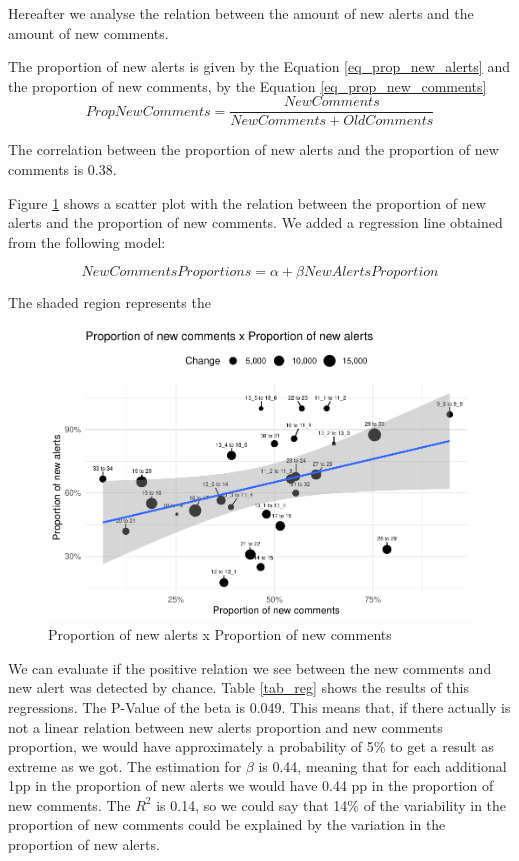 \documentclass[
]{article}
\begin{document}
Hereafter we analyse the relation between the amount of new alerts and
the amount of new comments.

The proportion of new alerts is given by the Equation \ref{eq_prop_new_alerts} and the proportion of new comments, by the Equation \ref{eq_prop_new_comments}
\begin{equation} \label{eq_prop_new_comments}
PropNewComments = \frac{NewComments}{NewComments + OldComments}
\end{equation}

The correlation between the proportion of new alerts and the proportion
of new comments is 0.38.

Figure \ref{scatter_prop} shows a scatter plot with the relation between
the proportion of new alerts and the proportion of new comments. We
added a regression line obtained from the following model:

\[ NewCommentsProportions = \alpha + \beta NewAlertsProportion \]

The shaded region represents the

\small

\begin{figure}
\centering
\includegraphics{report_files/figure-latex/unnamed-chunk-22-1.pdf}
\caption{\label{scatter_prop}Proportion of new alerts x Proportion of
new comments}
\end{figure}

\normalsize

We can evaluate if the positive relation we see between the new comments
and new alert was detected by chance. Table \ref{tab_reg} shows the
results of this regressions. The P-Value of the beta is 0.049. This
means that, if there actually is not a linear relation between new
alerts proportion and new comments proportion, we would have
approximately a probability of 5\% to get a result as extreme as we got.
The estimation for \(\beta\) is 0.44, meaning that for each additional
1pp in the proportion of new alerts we would have 0.44 pp in the
proportion of new comments. The \(R^2\) is 0.14, so we could say that
14\% of the variability in the proportion of new comments could be
explained by the variation in the proportion of new alerts.
\end{document}
